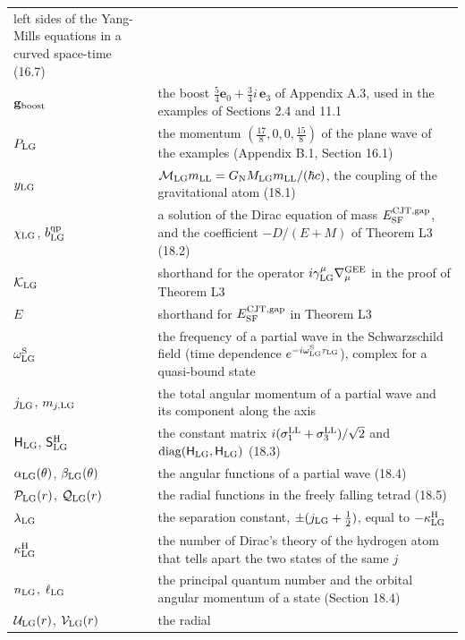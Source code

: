 \documentclass[
  10pt,
]{article}
\begin{document}
\begin{longtable}[]{@{}
  >{\raggedright\arraybackslash}p{}
  >{\raggedright\arraybackslash}p{}@{}}
left sides of the Yang-Mills equations in a curved space-time (16.7) \\
\(\mathbf g_{\rm boost}\) & the boost
\(\tfrac54\mathbf e_0+\tfrac34i\,\mathbf e_3\) of Appendix A.3, used in
the examples of Sections 2.4 and 11.1 \\
\(P_{\rm LG}\) & the momentum \((\tfrac{17}8,0,0,\tfrac{15}8)\) of the
plane wave of the examples (Appendix B.1, Section 16.1) \\
\(y_{\rm LG}\) &
\(\mathcal M_{\rm LG}m_{\rm LL}=G_{\rm N}M_{\rm LG}m_{\rm LL}/(\hbar c)\),
the coupling of the gravitational atom (18.1) \\
\(\chi_{\rm LG}\), \(b^{\rm qp}_{\rm LG}\) & a solution of the Dirac
equation of mass \(E^{\rm CJT,gap}_{\rm SF}\), and the coefficient
\(-D/(E+M)\) of Theorem L3 (18.2) \\
\(\mathcal K_{\rm LG}\) & shorthand for the operator
\(i\gamma^\mu_{\rm LG}\nabla^{\rm GEE}_\mu\) in the proof of Theorem
L3 \\
\(E\) & shorthand for \(E^{\rm CJT,gap}_{\rm SF}\) in Theorem L3 \\
\(\omega^{\rm S}_{\rm LG}\) & the frequency of a partial wave in the
Schwarzschild field (time dependence
\(e^{-i\omega^{\rm S}_{\rm LG}\tau_{\rm LG}}\)), complex for a
quasi-bound state \\
\(j_{\rm LG}\), \(m_{j,{\rm LG}}\) & the total angular momentum of a
partial wave and its component along the axis \\
\(\mathsf H_{\rm LG}\), \(\mathsf S^{\rm H}_{\rm LG}\) & the constant
matrix \(i(\sigma^{\rm LL}_1+\sigma^{\rm LL}_3)/\sqrt2\) and
\(\mathrm{diag}(\mathsf H_{\rm LG},\mathsf H_{\rm LG})\) (18.3) \\
\(\alpha_{\rm LG}(\theta)\), \(\beta_{\rm LG}(\theta)\) & the angular
functions of a partial wave (18.4) \\
\(\mathcal P_{\rm LG}(r)\), \(\mathcal Q_{\rm LG}(r)\) & the radial
functions in the freely falling tetrad (18.5) \\
\(\lambda_{\rm LG}\) & the separation constant,
\(\pm(j_{\rm LG}+\tfrac12)\), equal to \(-\kappa^{\rm H}_{\rm LG}\) \\
\(\kappa^{\rm H}_{\rm LG}\) & the number of Dirac's theory of the
hydrogen atom that tells apart the two states of the same \(j\) \\
\(n_{\rm LG}\), \(\ell_{\rm LG}\) & the principal quantum number and the
orbital angular momentum of a state (Section 18.4) \\
\(\mathcal U_{\rm LG}(r)\), \(\mathcal V_{\rm LG}(r)\) & the radial

\end{longtable}
\end{document}
